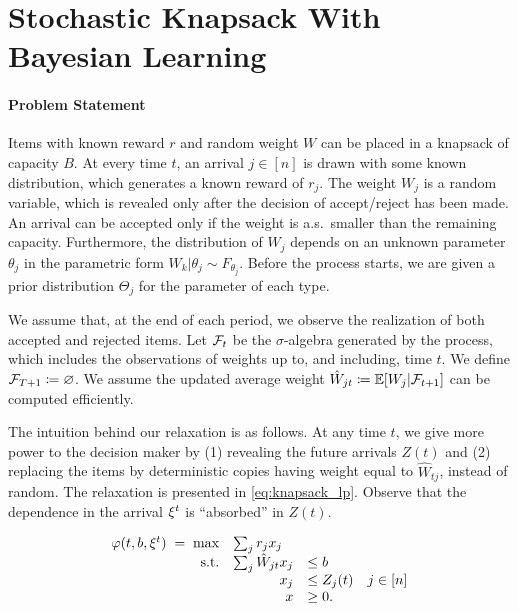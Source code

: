 \documentclass[letterpaper,11pt]{article}
\begin{document}
\section{Stochastic Knapsack With Bayesian Learning}

\paragraph{Problem Statement}
Items with known reward $r$ and random weight $W$ can be placed in a knapsack of capacity $B$.
At every time $t$, an arrival $j\in[n]$ is drawn with some known distribution, which generates a known reward of $r_j$.
The weight $W_j$ is a random variable, which is revealed only after the decision of accept/reject has been made.
An arrival can be accepted only if the weight is a.s.\ smaller than the remaining capacity.
Furthermore, the distribution of $W_j$ depends on an unknown parameter $\theta_j$ in the parametric form $W_k|\theta_j\sim F_{\theta_j}$.
Before the process starts, we are given a prior distribution $\Theta_j$ for the parameter of each type.

We assume that, at the end of each period, we observe the realization of both accepted and rejected items.
Let $\mathcal{F}_t$ be the $\sigma$-algebra generated by the process, which includes the observations of weights up to, and including, time $t$.
We define $\mathcal{F}_{T+1}\coloneqq\varnothing$.
We assume the updated average weight $\hat W_{jt} \coloneqq  \mathbb{E}[W_j|\mathcal{F}_{t+1}]$ can be computed efficiently.

The intuition behind our relaxation is as follows.
At any time $t$, we give more power to the decision maker by (1) revealing the future arrivals $Z(t)$ and (2) replacing the items by deterministic copies having weight equal to $\hat W_{tj}$, instead of random.
The relaxation is presented in \cref{eq:knapsack_lp}.
Observe that the dependence in the arrival $\xi^t$ is ``absorbed'' in $Z(t)$.

\begin{equation}\label{eq:knapsack_lp}
\begin{array}{rrll}
\varphi(t,b,\xit) \; = \; \max & \multicolumn{3}{l}{\sum_{j}r_{j}x_j} \\
\text{s.t.}& \sum_{j}\hat W_{jt}x_j  &\leq b  \\
&  x_j & \leq Z_j(t)  & j\in [n] \\
& x&\geq 0.
\end{array}
\end{equation}
\end{document}
